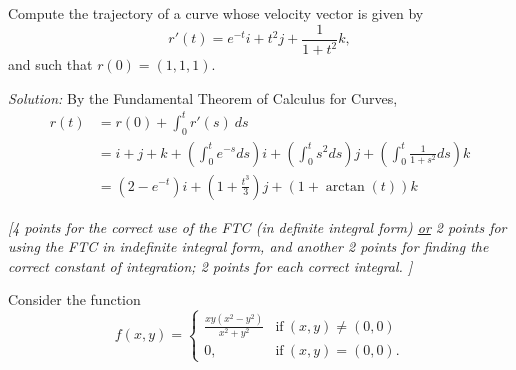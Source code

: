 \documentclass[11pt]{exam}
\begin{document}
\begin{questions}

\newpage

\addpoints
\question[10] Compute the trajectory of a curve whose velocity vector is given by 
\begin{equation*}
r'(t)= e^{-t}i + t^2j + \frac{1}{1+t^2} k,
\end{equation*}
and such that $r(0)=(1,1,1)$. 

\textit{Solution:} By the Fundamental Theorem of Calculus for Curves, 
\begin{align*}
r(t) & = r(0) +\int_{0}^{t} r'(s)\ ds\\
& = i + j +k + \left(\int_{0}^{t} e^{-s}ds \right)i + \left(\int_{0}^{t} s^2 ds\right)j + \left( \int_{0}^{t}  \frac{1}{1+s^2} ds \right) k \\
& = (2-e^{-t})i + \left( 1+ \frac{t^3}{3} \right)j + (1+\arctan(t))k
\end{align*}

\textit{[4 points for the correct use of the FTC (in definite integral form) \underline{or} 2 points for using the FTC in indefinite integral form, and another 2 points for finding the correct constant of integration; 2 points for each correct integral. ]}
\newpage



\addpoints

\addpoints
\question Consider the function
\begin{equation*}
f(x,y)=\left\{
\begin{array}{rc}
\frac{xy(x^2-y^2)}{x^2+y^2} & \mbox{if} \ (x,y) \neq (0,0)\\
0, & \mbox{if} \ (x,y)=(0,0).
\end{array}
\right.
\end{equation*}


\end{questions}
\end{document}
